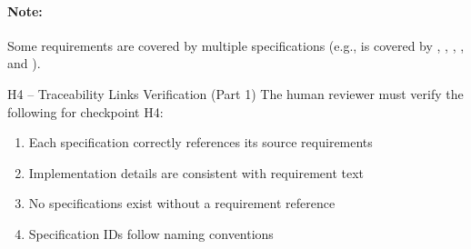 \paragraph{Note:} Some requirements are covered by multiple specifications
(e.g.,  is covered by ,
, , , and ).

\begin{hitlbox}{H4 -- Traceability Links Verification (Part 1)}
The human reviewer must verify the following for checkpoint H4:
\begin{enumerate}[noitemsep]
  \item Each specification correctly references its source requirements
  \item Implementation details are consistent with requirement text
  \item No specifications exist without a requirement reference
  \item Specification IDs follow naming conventions
\end{enumerate}
\end{hitlbox}
